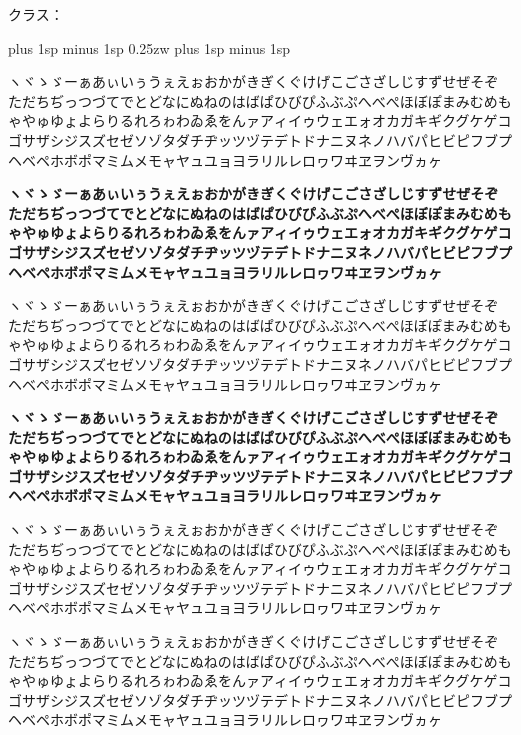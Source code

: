 \documentclass[a4paper,titlepage, draft]{\class}
\begin{document}
クラス：\texttt{\class}

\vspace{\baselineskip}
\huge
\kanjiskip 0pt plus 1sp minus 1sp
\xkanjiskip 0.25zw plus 1sp minus 1sp
{\propshape
\noindent ヽヾゝゞーぁあぃいぅうぇえぉおかがきぎくぐけげこごさざしじすずせぜそぞただちぢっつづてでとどなにぬねのはばぱひびぴふぶぷへべぺほぼぽまみむめもゃやゅゆょよらりるれろゎわゐゑをんァアィイゥウェエォオカガキギクグケゲコゴサザシジスズセゼソゾタダチヂッツヅテデトドナニヌネノハバパヒビピフブプヘベペホボポマミムメモャヤュユョヨラリルレロヮワヰヱヲンヴヵヶ

\bfseries
\noindent ヽヾゝゞーぁあぃいぅうぇえぉおかがきぎくぐけげこごさざしじすずせぜそぞただちぢっつづてでとどなにぬねのはばぱひびぴふぶぷへべぺほぼぽまみむめもゃやゅゆょよらりるれろゎわゐゑをんァアィイゥウェエォオカガキギクグケゲコゴサザシジスズセゼソゾタダチヂッツヅテデトドナニヌネノハバパヒビピフブプヘベペホボポマミムメモャヤュユョヨラリルレロヮワヰヱヲンヴヵヶ
}

{\gtfamily\mdseries\propshape
\noindent ヽヾゝゞーぁあぃいぅうぇえぉおかがきぎくぐけげこごさざしじすずせぜそぞただちぢっつづてでとどなにぬねのはばぱひびぴふぶぷへべぺほぼぽまみむめもゃやゅゆょよらりるれろゎわゐゑをんァアィイゥウェエォオカガキギクグケゲコゴサザシジスズセゼソゾタダチヂッツヅテデトドナニヌネノハバパヒビピフブプヘベペホボポマミムメモャヤュユョヨラリルレロヮワヰヱヲンヴヵヶ

\bfseries\propshape
\noindent ヽヾゝゞーぁあぃいぅうぇえぉおかがきぎくぐけげこごさざしじすずせぜそぞただちぢっつづてでとどなにぬねのはばぱひびぴふぶぷへべぺほぼぽまみむめもゃやゅゆょよらりるれろゎわゐゑをんァアィイゥウェエォオカガキギクグケゲコゴサザシジスズセゼソゾタダチヂッツヅテデトドナニヌネノハバパヒビピフブプヘベペホボポマミムメモャヤュユョヨラリルレロヮワヰヱヲンヴヵヶ
}

{\mgfamily\propshape
\noindent ヽヾゝゞーぁあぃいぅうぇえぉおかがきぎくぐけげこごさざしじすずせぜそぞただちぢっつづてでとどなにぬねのはばぱひびぴふぶぷへべぺほぼぽまみむめもゃやゅゆょよらりるれろゎわゐゑをんァアィイゥウェエォオカガキギクグケゲコゴサザシジスズセゼソゾタダチヂッツヅテデトドナニヌネノハバパヒビピフブプヘベペホボポマミムメモャヤュユョヨラリルレロヮワヰヱヲンヴヵヶ}

{\gtfamily\ebseries
\noindent ヽヾゝゞーぁあぃいぅうぇえぉおかがきぎくぐけげこごさざしじすずせぜそぞただちぢっつづてでとどなにぬねのはばぱひびぴふぶぷへべぺほぼぽまみむめもゃやゅゆょよらりるれろゎわゐゑをんァアィイゥウェエォオカガキギクグケゲコゴサザシジスズセゼソゾタダチヂッツヅテデトドナニヌネノハバパヒビピフブプヘベペホボポマミムメモャヤュユョヨラリルレロヮワヰヱヲンヴヵヶ
}
\end{document}
